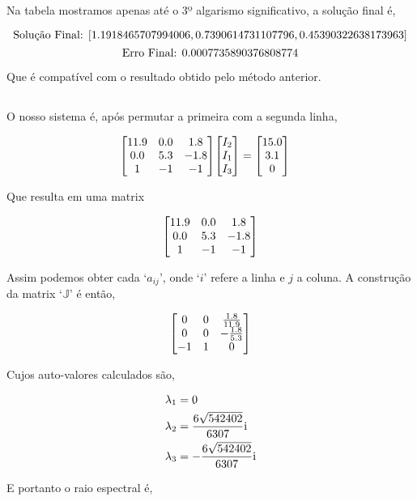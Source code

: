 \documentclass[twoside]{amsart}
\numberwithin{equation}{section}
\begin{document}
\justifying

Na tabela mostramos apenas até o 3º algarismo significativo, a solução final é,
   
$$\textnormal{Solução Final:   }  [1.1918465707994006, 0.7390614731107796, 0.45390322638173963]$$
$$\textnormal{Erro Final:   }  0.0007735890376808774$$

Que é compatível com o resultado obtido pelo método anterior.

\subsection{}

O nosso sistema é, após permutar a primeira com a segunda linha,

\begin{align}
    \mqty[ 11.9 & 0.0 & 1.8 \\ 0.0 & 5.3 & -1.8\\1 & -1 & -1]\mqty[ I_2\\I_1\\ I_3]&=\mqty[15.0\\3.1\\0]
\end{align}

Que resulta em uma matrix

\begin{align}
    \mqty[11.9 & 0.0 & 1.8 \\ 0.0 & 5.3 & -1.8\\1 & -1 & -1]
\end{align}

Assim podemos obter cada `$a_{ij}$', onde `$i$' refere a linha e $j$ a coluna. A construção da matrix `$\mathbb J$' é então,

\begin{align}
    \mqty[0 & 0 & \frac{1.8}{11.9} \\ 0 & 0 & -\frac{1.8}{5.3}\\-1 & 1 & 0 ]
\end{align}

Cujos auto-valores calculados são,

\begin{align}
    \lambda_1 &= 0\\
    \lambda_2 &= \frac{6\sqrt{542402}}{6307}\textnormal{i}\\
    \lambda_3 &=- \frac{6\sqrt{542402}}{6307}\textnormal{i}
\end{align}

E portanto o raio espectral é,
\end{document}

